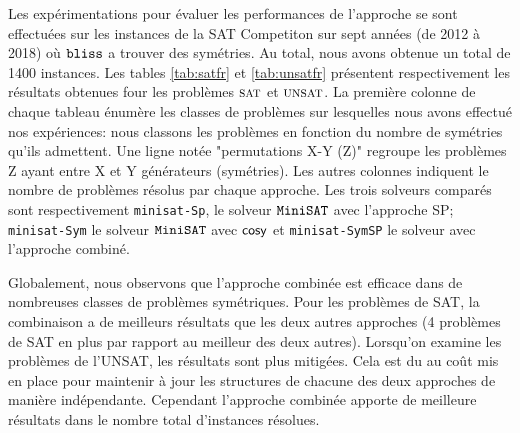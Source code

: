 \begin{table}[!htbp]\footnotesize
	\centering
	\caption{Comparaison des approches sur les instances UNSAT.}
	\label{tab:unsatfr}
\end{table}

Les expérimentations pour évaluer les performances de l'approche se sont effectuées sur les instances de la SAT Competiton sur sept années 
(de 2012 à 2018) où $\texttt{bliss}$ a trouver des symétries. Au total, nous avons obtenue un total de 1400 instances. 
Les tables \ref{tab:satfr} et \ref{tab:unsatfr} présentent respectivement
les résultats obtenues four les problèmes $\textsc{sat}$ et $\textsc{unsat}$.
La première colonne de chaque tableau énumère les classes de problèmes sur lesquelles nous avons effectué nos expériences: nous classons les problèmes en fonction du nombre de symétries qu'ils admettent. Une ligne notée "permutations X-Y (Z)" regroupe les problèmes Z ayant entre X et Y générateurs (symétries). Les autres colonnes indiquent le nombre de problèmes résolus par chaque approche. Les trois solveurs comparés sont respectivement
\texttt{minisat-Sp}, le solveur $\texttt{MiniSAT}$ avec l'approche SP; \texttt{minisat-Sym} le solveur $\texttt{MiniSAT}$ avec $\textsf{cosy}$ et \texttt{minisat-SymSP} le solveur avec l'approche combiné.
 
Globalement, nous observons que l'approche combinée est efficace dans de nombreuses classes de problèmes symétriques. Pour les problèmes de SAT, la combinaison a de meilleurs résultats que les deux autres approches (4 problèmes de SAT en plus par rapport au meilleur des deux autres). Lorsqu'on examine les problèmes de l'UNSAT, les résultats sont plus mitigées. Cela est du au coût mis en place pour maintenir à jour les structures de chacune des deux approches de manière indépendante.
Cependant l'approche combinée apporte de meilleure résultats dans le nombre total d'instances résolues.

